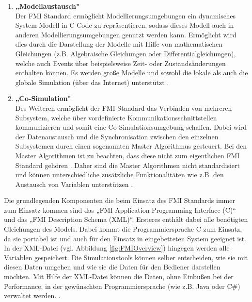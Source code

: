\begin{enumerate}
	\item \textbf{„Modellaustausch"} \cite[S.4]{25} \\
	Der FMI Standard ermöglicht Modellierungsumgebungen ein dynamisches System Modell in C-Code zu repräsentieren, sodass dieses Modell auch in anderen Modellierungsumgebungen genutzt werden kann. Ermöglicht wird dies durch die Darstellung der Modelle mit Hilfe von mathematischen Gleichungen (z.B. Algebraische Gleichungen oder Differentialgleichungen), welche auch Events über beispielsweise Zeit- oder Zustandsänderungen enthalten können. Es werden große Modelle und sowohl die lokale als auch die globale Simulation (über das Internet) unterstützt \cite[S.4]{25}.
	\item \textbf{„Co-Simulation"} \cite[S.4]{25} \\
	Des Weiteren ermöglicht der FMI Standard das Verbinden von mehreren Subsystem, welche über vordefinierte Kommunikationsschnittstellen kommunizieren und somit eine Co-Simulationsumgebung schaffen. Dabei wird der Datenaustausch und die Synchronisation zwischen den einzelnen Subsystemen durch einen sogenannten Master Algorithmus gesteuert. Bei den Master Algorithmen ist zu beachten, dass diese nicht zum eigentlichen FMI Standard gehören \cite[S.4]{25}. Daher sind die Master Algorithmen nicht standardisiert und können unterschiedliche zusätzliche Funktionalitäten wie z.B. den Austausch von Variablen unterstützen \cite[S.1]{24}.
\end{enumerate}
Die grundlegenden Komponenten die beim Einsatz des FMI Standards immer zum Einsatz kommen sind das „FMI Application Programming Interface (C)“ und das „FMI Description Schema (XML)“. Ersteres enthält dabei alle benötigten Gleichungen des Models. Dabei kommt die Programmiersprache C zum Einsatz, da sie portabel ist und auch für den Einsatz in eingebetteten System geeignet ist. In der XML-Datei (vgl. Abbildung \ref{fig:FMIOverview}) hingegen werden alle Variablen gespeichert. Die Simulationstools können selber entscheiden, wie sie mit diesen Daten umgehen und wie sie die Daten für den Bediener darstellen möchten. Mit Hilfe der XML-Datei können die Daten, ohne Einbußen bei der Performance, in der gewünschten Programmiersprache (wie z.B. Java oder C\#) verwaltet werden.
\cite[S.8]{25}.
\newpage
